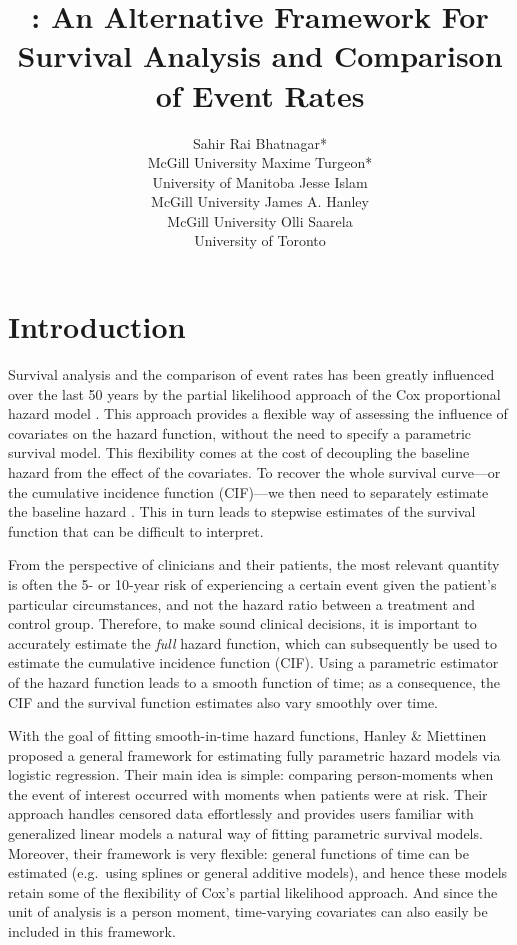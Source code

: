 \documentclass[
]{jss}
\author{
Sahir Rai Bhatnagar*\\McGill University \And Maxime Turgeon*\\University of Manitoba \AND Jesse Islam\\McGill University \And James A. Hanley\\McGill University \And Olli Saarela\\University of Toronto
}
\title{\pkg{casebase}: An Alternative Framework For Survival Analysis and
Comparison of Event Rates}
\begin{document}
\hypertarget{introduction}{%
\section{Introduction}\label{introduction}}

Survival analysis and the comparison of event rates has been greatly
influenced over the last 50 years by the partial likelihood approach of
the Cox proportional hazard model \citep{cox1972regression}. This
approach provides a flexible way of assessing the influence of
covariates on the hazard function, without the need to specify a
parametric survival model. This flexibility comes at the cost of
decoupling the baseline hazard from the effect of the covariates. To
recover the whole survival curve---or the cumulative incidence function
(CIF)---we then need to separately estimate the baseline hazard
\citep{breslow1972discussion}. This in turn leads to stepwise estimates
of the survival function that can be difficult to interpret.

From the perspective of clinicians and their patients, the most relevant
quantity is often the 5- or 10-year risk of experiencing a certain event
given the patient's particular circumstances, and not the hazard ratio
between a treatment and control group. Therefore, to make sound clinical
decisions, it is important to accurately estimate the \emph{full} hazard
function, which can subsequently be used to estimate the cumulative
incidence function (CIF). Using a parametric estimator of the hazard
function leads to a smooth function of time; as a consequence, the CIF
and the survival function estimates also vary smoothly over time.

With the goal of fitting smooth-in-time hazard functions, Hanley \&
Miettinen \citeyearpar{hanley2009fitting} proposed a general framework
for estimating fully parametric hazard models via logistic regression.
Their main idea is simple: comparing person-moments when the event of
interest occurred with moments when patients were at risk. Their
approach handles censored data effortlessly and provides users familiar
with generalized linear models a natural way of fitting parametric
survival models. Moreover, their framework is very flexible: general
functions of time can be estimated (e.g.~using splines or general
additive models), and hence these models retain some of the flexibility
of Cox's partial likelihood approach. And since the unit of analysis is
a person moment, time-varying covariates can also easily be included in
this framework.
\end{document}
